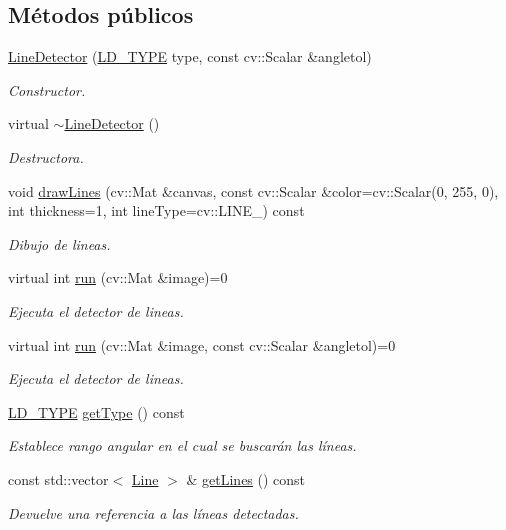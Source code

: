 \subsection*{Métodos públicos}
\begin{DoxyCompactItemize}
\item 
\hyperlink{class_i3_d_1_1_line_detector_a337305d13282d028b427787271e8d53d}{Line\+Detector} (\hyperlink{namespace_i3_d_ac3913218d62e4e56ed38931636256ae2}{L\+D\+\_\+\+T\+Y\+PE} type, const cv\+::\+Scalar \&angletol)
\begin{DoxyCompactList}\small\item\em Constructor. \end{DoxyCompactList}\item 
virtual \hyperlink{class_i3_d_1_1_line_detector_a1725fe70dfe60c340fb9c5f7609110e4}{$\sim$\+Line\+Detector} ()
\begin{DoxyCompactList}\small\item\em Destructora. \end{DoxyCompactList}\item 
void \hyperlink{class_i3_d_1_1_line_detector_a057a60f78b7bfa5b6f6f31d8ee8bfe87}{draw\+Lines} (cv\+::\+Mat \&canvas, const cv\+::\+Scalar \&color=cv\+::\+Scalar(0, 255, 0), int thickness=1, int line\+Type=cv\+::\+L\+I\+N\+E\+\_) const 
\begin{DoxyCompactList}\small\item\em Dibujo de lineas. \end{DoxyCompactList}\item 
virtual int \hyperlink{class_i3_d_1_1_line_detector_ad439cb59972938259f6b36bcdbb644b7}{run} (cv\+::\+Mat \&image)=0
\begin{DoxyCompactList}\small\item\em Ejecuta el detector de lineas. \end{DoxyCompactList}\item 
virtual int \hyperlink{class_i3_d_1_1_line_detector_abc00c6e15e2386a32720886d60a20ccd}{run} (cv\+::\+Mat \&image, const cv\+::\+Scalar \&angletol)=0
\begin{DoxyCompactList}\small\item\em Ejecuta el detector de lineas. \end{DoxyCompactList}\item 
\hyperlink{namespace_i3_d_ac3913218d62e4e56ed38931636256ae2}{L\+D\+\_\+\+T\+Y\+PE} \hyperlink{class_i3_d_1_1_line_detector_a93add9094451f5b622c85821f29b70f9}{get\+Type} () const 
\begin{DoxyCompactList}\small\item\em Establece rango angular en el cual se buscarán las líneas. \end{DoxyCompactList}\item 
const std\+::vector$<$ \hyperlink{group___geometric_entities_ga483b43891a1b33d99406fdc397e9a445}{Line} $>$ \& \hyperlink{class_i3_d_1_1_line_detector_a289e75fcd682e07fc748ddc096e98349}{get\+Lines} () const 
\begin{DoxyCompactList}\small\item\em Devuelve una referencia a las líneas detectadas. \end{DoxyCompactList}\end{DoxyCompactItemize}
